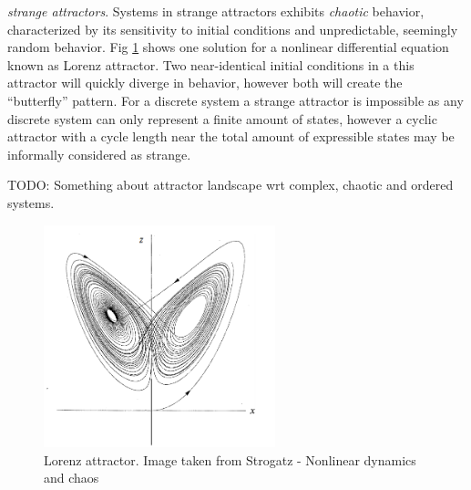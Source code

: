 \emph{strange attractors}.
Systems in strange attractors exhibits \emph{chaotic} behavior, characterized by
its sensitivity to initial conditions and unpredictable, seemingly random
behavior.
Fig \ref{figStrange} shows one solution for a nonlinear differential equation known
as Lorenz attractor.
Two near-identical initial conditions in a this attractor will quickly diverge in
behavior, however both will create the ``butterfly'' pattern.
For a discrete system a strange attractor is impossible as any discrete system
can only represent a finite amount of states, however a cyclic attractor with a
cycle length near the total amount of expressible states may be informally
considered as strange.\par
% 
TODO: Something about attractor landscape wrt complex, chaotic and ordered systems.
\begin{figure}[h!]
  \centering
  \includegraphics[width=0.6\textwidth]{fig/strange.png}
  \caption{Lorenz attractor. Image taken from Strogatz - Nonlinear dynamics and chaos}
  \label{figStrange}
\end{figure}
%
